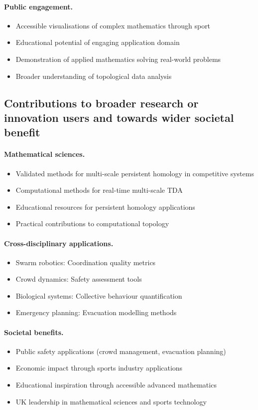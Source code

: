 \paragraph{Public engagement.}
\begin{itemize}
  \item Accessible visualisations of complex mathematics through sport
  \item Educational potential of engaging application domain
  \item Demonstration of applied mathematics solving real-world problems
  \item Broader understanding of topological data analysis
\end{itemize}

\subsection{Contributions to broader research or innovation users and towards wider societal benefit}

\paragraph{Mathematical sciences.}
\begin{itemize}
  \item Validated methods for multi-scale persistent homology in competitive systems
  \item Computational methods for real-time multi-scale TDA
  \item Educational resources for persistent homology applications
  \item Practical contributions to computational topology
\end{itemize}

\paragraph{Cross-disciplinary applications.}
\begin{itemize}
  \item Swarm robotics: Coordination quality metrics
  \item Crowd dynamics: Safety assessment tools
  \item Biological systems: Collective behaviour quantification
  \item Emergency planning: Evacuation modelling methods
\end{itemize}

\paragraph{Societal benefits.}
\begin{itemize}
  \item Public safety applications (crowd management, evacuation planning)
  \item Economic impact through sports industry applications
  \item Educational inspiration through accessible advanced mathematics
  \item UK leadership in mathematical sciences and sports technology
\end{itemize}

